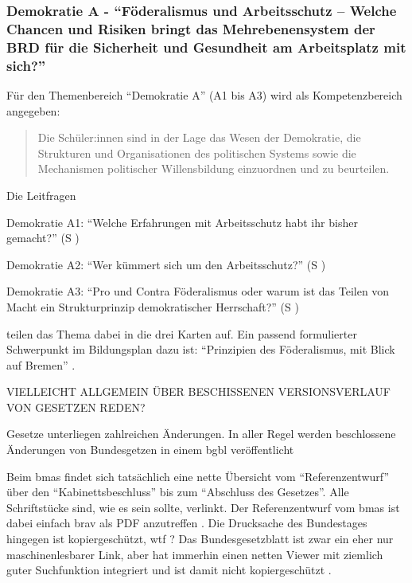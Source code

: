 \subsubsection{Demokratie A - \enquote{Föderalismus und Arbeitsschutz – Welche Chancen und Risiken bringt das Mehrebenensystem der BRD für die Sicherheit und Gesundheit am Arbeitsplatz mit sich?} \label{DemokratieA}}

Für den Themenbereich \enquote{Demokratie A} (A1 bis A3) wird als Kompetenzbereich angegeben:
\begin{quote}
    Die Schüler:innen sind in der Lage das Wesen der Demokratie, die Strukturen und Organisationen des politischen Systems sowie die Mechanismen politischer Willensbildung einzuordnen und zu beurteilen.
    
    \autocite[im Bildungsplan:][16]{bplan}
\end{quote}


Die Leitfragen
\begin{myenumerate}
    \item Demokratie A1: \enquote{Welche Erfahrungen mit Arbeitsschutz habt ihr bisher gemacht?} (\gls{S} \pageref{DEMOKRATIE-A1})
    \item Demokratie A2: \enquote{Wer kümmert sich um den Arbeitsschutz?} (\gls{S} \pageref{DEMOKRATIE-A2})
    \item Demokratie A3: \enquote{Pro und Contra Föderalismus oder warum ist das Teilen von Macht ein Strukturprinzip demokratischer Herrschaft?} (\gls{S} \pageref{DEMOKRATIE-A3})
\end{myenumerate}
teilen das Thema dabei in die drei Karten auf.
Ein passend formulierter Schwerpunkt im Bildungsplan dazu ist: \enquote{Prinzipien des Föderalismus, mit Blick auf Bremen} \autocite[16]{bplan}.


VIELLEICHT ALLGEMEIN ÜBER BESCHISSENEN VERSIONSVERLAUF VON GESETZEN REDEN?

Gesetze unterliegen zahlreichen Änderungen. In aller Regel werden beschlossene Änderungen von Bundesgetzen in einem \gls{bgbl} veröffentlicht  


Beim \gls{bmas} findet sich tatsächlich eine nette Übersicht vom \enquote{Referenzentwurf} über den \enquote{Kabinettsbeschluss} bis zum \enquote{Abschluss des Gesetzes}.
Alle Schriftstücke sind, wie es sein sollte, verlinkt. Der Referenzentwurf vom \gls{bmas} ist dabei einfach brav als PDF anzutreffen \autocite{BMAS-21.07.2020}. 
Die Drucksache des Bundestages hingegen ist kopiergeschützt, wtf \autocite{Bundestag.31.08.2020}?
Das Bundesgesetzblatt ist zwar ein eher nur maschinenlesbarer Link, aber hat immerhin einen netten Viewer mit ziemlich guter Suchfunktion integriert und ist damit nicht kopiergeschützt \autocite{BGBl.2020-I-Nr67}. 

